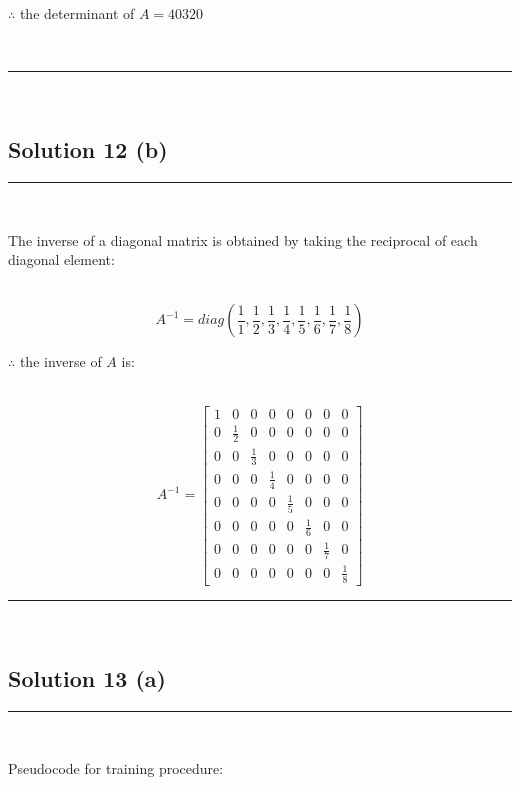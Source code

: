 \documentclass{article}
\begin{document}
\parbox{\textwidth}{$\therefore$ the determinant of $A= 40320$}\\

\noindent\rule{\textwidth}{0.4pt}\\
\newpage
\subsection*{Solution 12 (b)}
\noindent\rule{\textwidth}{0.4pt}\\

\parbox{\textwidth}{The inverse of a diagonal matrix is obtained by taking the reciprocal of each diagonal element:}\\
$$A^{-1} = diag\left(\frac{1}{1}, \frac{1}{2}, \frac{1}{3}, \frac{1}{4}, \frac{1}{5}, \frac{1}{6}, \frac{1}{7}, \frac{1}{8}\right)$$

\parbox{\textwidth}{$\therefore$ the inverse of $A$ is:}\\
$$A^{-1} = \begin{bmatrix}
    1 & 0 & 0 & 0 & 0 & 0 & 0 & 0 \\
    0 & \frac{1}{2} & 0 & 0 & 0 & 0 & 0 & 0 \\
    0 & 0 & \frac{1}{3} & 0 & 0 & 0 & 0 & 0 \\
    0 & 0 & 0 & \frac{1}{4} & 0 & 0 & 0 & 0 \\
    0 & 0 & 0 & 0 & \frac{1}{5} & 0 & 0 & 0 \\
    0 & 0 & 0 & 0 & 0 & \frac{1}{6} & 0 & 0 \\
    0 & 0 & 0 & 0 & 0 & 0 & \frac{1}{7} & 0 \\
    0 & 0 & 0 & 0 & 0 & 0 & 0 & \frac{1}{8}
\end{bmatrix}$$
\noindent\rule{\textwidth}{0.4pt}\\
\newpage
\subsection*{Solution 13 (a)}

\noindent\rule{\textwidth}{0.4pt}\\

\parbox{\textwidth}{Pseudocode for training procedure:}\\
\end{document}
